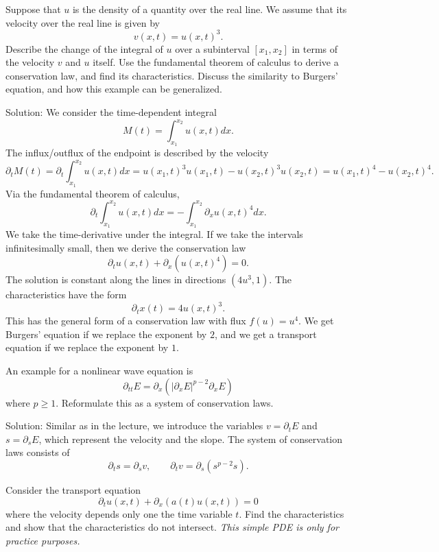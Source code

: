 \documentclass{article}
\begin{document}




\begin{exerciseList}

\item 
Suppose that $u$ is the density of a quantity over the real line.
We assume that its velocity over the real line is given by
$$
    v(x,t) = u(x,t)^3.
$$
Describe the change of the integral of $u$ over a subinterval $[x_1,x_2]$ in terms of the velocity $v$ and $u$ itself. Use the fundamental theorem of calculus to derive a conservation law, and find its characteristics. 
Discuss the similarity to Burgers' equation, and how this example can be generalized.

Solution:
We consider the time-dependent integral 
$$
    M(t) = \int_{x_1}^{x_2} u(x,t) dx.
$$
The influx/outflux of the endpoint is described by the velocity 
$$
    \partial_t M(t) 
    =
    \partial_t \int_{x_1}^{x_2} u(x,t) dx
    =
    u(x_1,t)^3 u(x_1,t) - u(x_2,t)^3 u(x_2,t) 
    =
    u(x_1,t)^4 - u(x_2,t)^4 
    .
$$
Via the fundamental theorem of calculus,
$$
    \partial_t \int_{x_1}^{x_2} u(x,t) dx
    =
    - \int_{x_1}^{x_2} \partial_x u(x,t)^4 dx
    .
$$
We take the time-derivative under the integral. 
If we take the intervals infinitesimally small, then we derive the conservation law
$$
    \partial_t u(x,t)
    +
    \partial_x \left( u(x,t)^4 \right)
    =
    0
    .
$$
The solution is constant along the lines in directions $(4u^3,1)$.
The characteristics have the form 
$$
    \partial_t x(t) = 4u(x,t)^3.
$$
This has the general form of a conservation law with flux $f(u) = u^4$.
We get Burgers' equation if we replace the exponent by $2$,
and we get a transport equation if we replace the exponent by $1$.



\item 
An example for a nonlinear wave equation is
$$
    \partial_{tt} E = \partial_{x} \left( |\partial_x E|^{p-2} \partial_x E \right)
$$
where $p \geq 1$. Reformulate this as a system of conservation laws.

Solution:
Similar as in the lecture, we introduce the variables $v = \partial_t E$ and $s = \partial_s E$, which represent the velocity and the slope.
The system of conservation laws consists of 
$$
    \partial_t s = \partial_s v,
    \qquad
    \partial_t v = \partial_s \left( s^{p-2} s \right).
$$




\item 
Consider the transport equation 
$$
    \partial_t u(x,t) + \partial_x\left( a(t) u(x,t) \right) = 0
$$
where the velocity depends only one the time variable $t$.
Find the characteristics and show that the characteristics do not intersect.
\textit{This simple PDE is only for practice purposes.}


\end{exerciseList}
\end{document}
